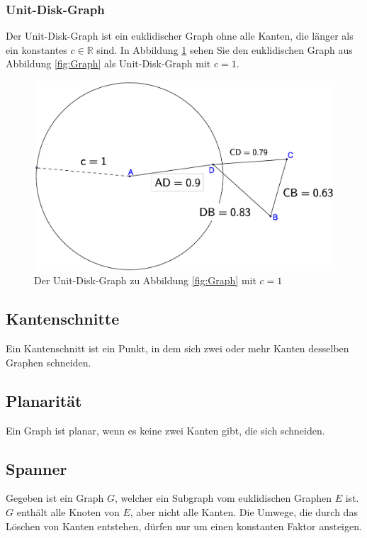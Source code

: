 \documentclass[a4paper,twoside]{IEEEtran}
\begin{document}
\subsubsection{Unit-Disk-Graph}
Der Unit-Disk-Graph ist ein euklidischer Graph ohne alle Kanten, die länger als ein konstantes $c \in \mathds{R} $ sind.
In Abbildung \ref{fig:UnitGraph} sehen Sie den euklidischen Graph aus Abbildung \ref{fig:Graph} als Unit-Disk-Graph mit $c = 1 $.
\begin{figure}[h!]
\centering
\includegraphics[width=0.99\linewidth]{UnitGraph.eps}
\caption{Der Unit-Disk-Graph zu Abbildung \ref{fig:Graph} mit $c = 1 $}
\label{fig:UnitGraph}
\end{figure}

\subsection{Kantenschnitte} \label{Kantenschnitt}
Ein Kantenschnitt ist ein Punkt, in dem sich zwei oder mehr Kanten desselben Graphen schneiden.

\subsection{Planarität}
Ein Graph ist planar, wenn es keine zwei Kanten gibt, die sich schneiden.


\subsection{Spanner}
Gegeben ist ein Graph $G $, welcher ein Subgraph vom euklidischen Graphen $E $ ist.
$G $ enthält alle Knoten von $E $, aber nicht alle Kanten. 
Die Umwege, die durch das Löschen von Kanten entstehen, dürfen nur um einen konstanten Faktor ansteigen. 
\end{document}
